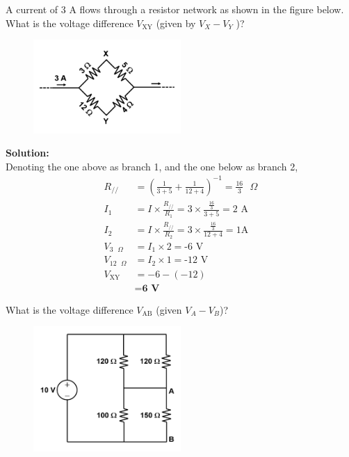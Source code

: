 \documentclass[a4paper, 12pt, addpoints]{exam}
\begin{document}
\begin{questions}
\question A current of 3 A flows through a resistor network as shown in the figure below. What is the voltage difference $V_\text{XY}$ (given by $V_X - V_Y$ )?
\begin{figure}[h!]
    \centering
    \includegraphics[width=0.5\textwidth]{images/Q7.png}
\end{figure}

\begin{tcolorbox}
    \textbf{Solution:} \\
    Denoting the one above as branch 1, and the one below as branch 2,
    \begin{align*}
        R_{//} &= (\frac{1}{3+5} + \frac{1}{12+4})^{-1} = \frac{16}{3}\text{ }\Omega \\
        I_1 &= I \times \frac{R_{//}}{R_1} = 3 \times \frac{\frac{16}{3}}{3+5} = 2\text{ A}\\
        I_2 &= I \times \frac{R_{//}}{R_2} = 3 \times \frac{\frac{16}{3}}{12+4} = 1\text{A} \\
        V_{3\text{ }\Omega} &= I_1 \times 2 = \text{-6 V} \\
        V_{12\text{ }\Omega} &= I_2 \times 1 = \text{-12 V}\\
        V_\text{XY} &= -6 - (-12) \\
        &= \textbf{6 V}
    \end{align*}
\end{tcolorbox}

\question What is the voltage difference $V_\text{AB}$ (given $V_A - V_B$)?
\begin{figure}[h!]
    \centering
    \includegraphics[width=0.5\textwidth]{images/Q8.png}
\end{figure}


\end{questions}
\end{document}
